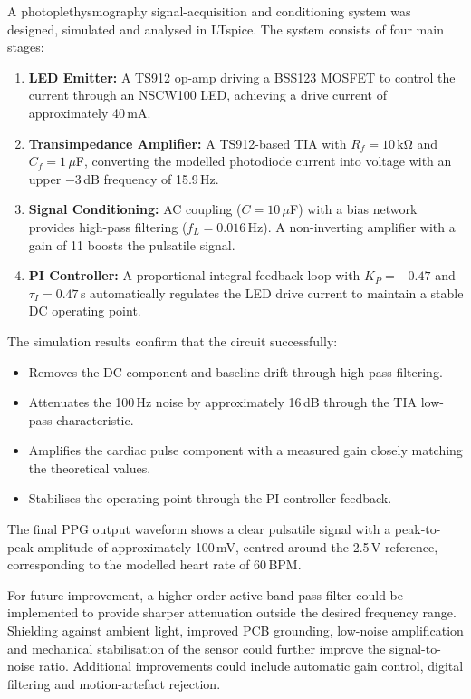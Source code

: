 \documentclass[10pt]{article}
\begin{document}
A photoplethysmography signal-acquisition and conditioning system was designed, simulated and analysed in LTspice. The system consists of four main stages:

\begin{enumerate}
    \item \textbf{LED Emitter:} A TS912 op-amp driving a BSS123 MOSFET to control the current through an NSCW100 LED, achieving a drive current of approximately 40\,mA.
    \item \textbf{Transimpedance Amplifier:} A TS912-based TIA with $R_f = 10\,\mathrm{k\Omega}$ and $C_f = 1\,\mu$F, converting the modelled photodiode current into voltage with an upper $-3$\,dB frequency of 15.9\,Hz.
    \item \textbf{Signal Conditioning:} AC coupling ($C = 10\,\mu$F) with a bias network provides high-pass filtering ($f_L = 0.016$\,Hz). A non-inverting amplifier with a gain of 11 boosts the pulsatile signal.
    \item \textbf{PI Controller:} A proportional-integral feedback loop with $K_P = -0.47$ and $\tau_I = 0.47$\,s automatically regulates the LED drive current to maintain a stable DC operating point.
\end{enumerate}

The simulation results confirm that the circuit successfully:
\begin{itemize}
    \item Removes the DC component and baseline drift through high-pass filtering.
    \item Attenuates the 100\,Hz noise by approximately 16\,dB through the TIA low-pass characteristic.
    \item Amplifies the cardiac pulse component with a measured gain closely matching the theoretical values.
    \item Stabilises the operating point through the PI controller feedback.
\end{itemize}

The final PPG output waveform shows a clear pulsatile signal with a peak-to-peak amplitude of approximately 100\,mV, centred around the 2.5\,V reference, corresponding to the modelled heart rate of 60\,BPM.

For future improvement, a higher-order active band-pass filter could be implemented to provide sharper attenuation outside the desired frequency range. Shielding against ambient light, improved PCB grounding, low-noise amplification and mechanical stabilisation of the sensor could further improve the signal-to-noise ratio. Additional improvements could include automatic gain control, digital filtering and motion-artefact rejection.
\end{document}
